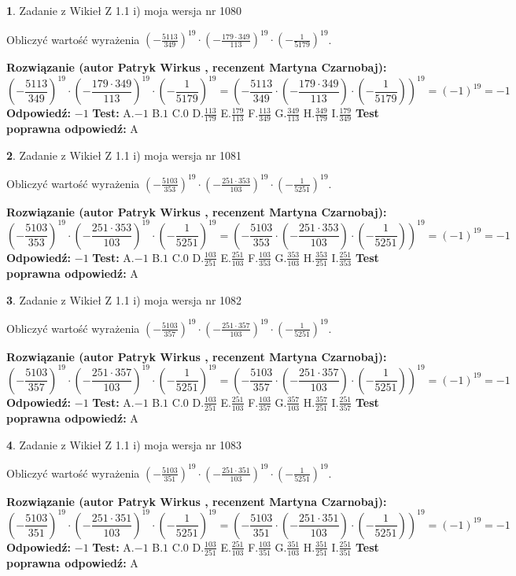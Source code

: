 \documentclass[12pt, a4paper]{article}
\theoremstyle{definition} %
\newtheorem{zad}{}
\newcommand{\zadStart}[1]{\begin{zad}#1\newline}
\newcommand{\zadStop}{\end{zad}}
\newcommand{\rozwStart}[2]{\noindent \textbf{Rozwiązanie (autor #1 , recenzent #2): }\newline}
\newcommand{\rozwStop}{\newline}
\newcommand{\odpStart}{\noindent \textbf{Odpowiedź:}\newline}
\newcommand{\odpStop}{\newline}
\newcommand{\testStart}{\noindent \textbf{Test:}\newline}
\newcommand{\testStop}{\newline}
\newcommand{\kluczStart}{\noindent \textbf{Test poprawna odpowiedź:}\newline}
\newcommand{\kluczStop}{\newline}
\begin{document}
\zadStart{Zadanie z Wikieł Z 1.1 i) moja wersja nr 1080}

Obliczyć wartość wyrażenia $(-\frac{5113}{349})^{19} \cdot (-\frac{179 \cdot 349}{113})^{19} \cdot (-\frac{1}{5179})^{19}$.
\zadStop
\rozwStart{Patryk Wirkus}{Martyna Czarnobaj}
$$(-\frac{5113}{349})^{19} \cdot (-\frac{179 \cdot 349}{113})^{19} \cdot (-\frac{1}{5179})^{19} = (-\frac{5113}{349} \cdot (-\frac{179 \cdot 349}{113}) \cdot (-\frac{1}{5179}))^{19} = (-1)^{19} = -1$$
\rozwStop
\odpStart
$-1$
\odpStop
\testStart
A.$-1$ B.$1$ C.$0$ D.$\frac{113}{179}$ E.$\frac{179}{113}$
F.$\frac{113}{349}$ G.$\frac{349}{113}$
H.$\frac{349}{179}$
I.$\frac{179}{349}$
\testStop
\kluczStart
A
\kluczStop



\zadStart{Zadanie z Wikieł Z 1.1 i) moja wersja nr 1081}

Obliczyć wartość wyrażenia $(-\frac{5103}{353})^{19} \cdot (-\frac{251 \cdot 353}{103})^{19} \cdot (-\frac{1}{5251})^{19}$.
\zadStop
\rozwStart{Patryk Wirkus}{Martyna Czarnobaj}
$$(-\frac{5103}{353})^{19} \cdot (-\frac{251 \cdot 353}{103})^{19} \cdot (-\frac{1}{5251})^{19} = (-\frac{5103}{353} \cdot (-\frac{251 \cdot 353}{103}) \cdot (-\frac{1}{5251}))^{19} = (-1)^{19} = -1$$
\rozwStop
\odpStart
$-1$
\odpStop
\testStart
A.$-1$ B.$1$ C.$0$ D.$\frac{103}{251}$ E.$\frac{251}{103}$
F.$\frac{103}{353}$ G.$\frac{353}{103}$
H.$\frac{353}{251}$
I.$\frac{251}{353}$
\testStop
\kluczStart
A
\kluczStop



\zadStart{Zadanie z Wikieł Z 1.1 i) moja wersja nr 1082}

Obliczyć wartość wyrażenia $(-\frac{5103}{357})^{19} \cdot (-\frac{251 \cdot 357}{103})^{19} \cdot (-\frac{1}{5251})^{19}$.
\zadStop
\rozwStart{Patryk Wirkus}{Martyna Czarnobaj}
$$(-\frac{5103}{357})^{19} \cdot (-\frac{251 \cdot 357}{103})^{19} \cdot (-\frac{1}{5251})^{19} = (-\frac{5103}{357} \cdot (-\frac{251 \cdot 357}{103}) \cdot (-\frac{1}{5251}))^{19} = (-1)^{19} = -1$$
\rozwStop
\odpStart
$-1$
\odpStop
\testStart
A.$-1$ B.$1$ C.$0$ D.$\frac{103}{251}$ E.$\frac{251}{103}$
F.$\frac{103}{357}$ G.$\frac{357}{103}$
H.$\frac{357}{251}$
I.$\frac{251}{357}$
\testStop
\kluczStart
A
\kluczStop



\zadStart{Zadanie z Wikieł Z 1.1 i) moja wersja nr 1083}

Obliczyć wartość wyrażenia $(-\frac{5103}{351})^{19} \cdot (-\frac{251 \cdot 351}{103})^{19} \cdot (-\frac{1}{5251})^{19}$.
\zadStop
\rozwStart{Patryk Wirkus}{Martyna Czarnobaj}
$$(-\frac{5103}{351})^{19} \cdot (-\frac{251 \cdot 351}{103})^{19} \cdot (-\frac{1}{5251})^{19} = (-\frac{5103}{351} \cdot (-\frac{251 \cdot 351}{103}) \cdot (-\frac{1}{5251}))^{19} = (-1)^{19} = -1$$
\rozwStop
\odpStart
$-1$
\odpStop
\testStart
A.$-1$ B.$1$ C.$0$ D.$\frac{103}{251}$ E.$\frac{251}{103}$
F.$\frac{103}{351}$ G.$\frac{351}{103}$
H.$\frac{351}{251}$
I.$\frac{251}{351}$
\testStop
\kluczStart
A
\kluczStop
\end{document}
